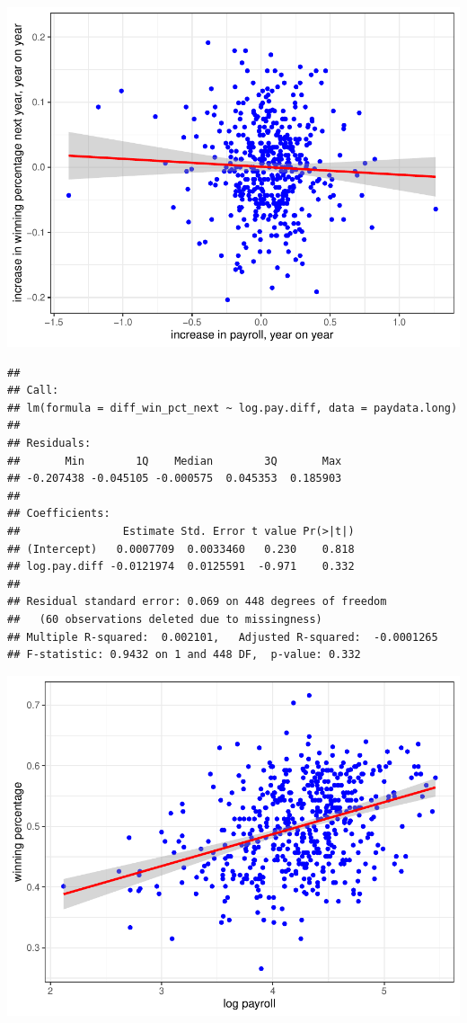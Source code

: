 \documentclass[
  12pt,
]{article}
\begin{document}
\includegraphics{hw1_sol_files/figure-latex/unnamed-chunk-17-3.pdf}

\begin{verbatim}
## 
## Call:
## lm(formula = diff_win_pct_next ~ log.pay.diff, data = paydata.long)
## 
## Residuals:
##       Min        1Q    Median        3Q       Max 
## -0.207438 -0.045105 -0.000575  0.045353  0.185903 
## 
## Coefficients:
##                Estimate Std. Error t value Pr(>|t|)
## (Intercept)   0.0007709  0.0033460   0.230    0.818
## log.pay.diff -0.0121974  0.0125591  -0.971    0.332
## 
## Residual standard error: 0.069 on 448 degrees of freedom
##   (60 observations deleted due to missingness)
## Multiple R-squared:  0.002101,   Adjusted R-squared:  -0.0001265 
## F-statistic: 0.9432 on 1 and 448 DF,  p-value: 0.332
\end{verbatim}

\includegraphics{hw1_sol_files/figure-latex/unnamed-chunk-18-1.pdf}
\end{document}
